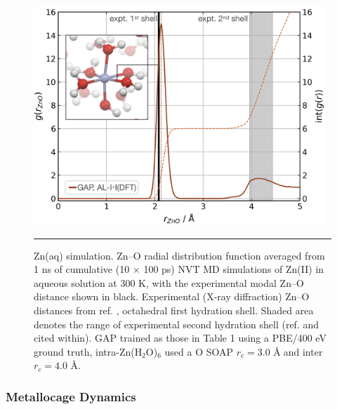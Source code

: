 \documentclass[../../main.tex]{subfiles}
\begin{document}
\begin{figure}[h!]
	\vspace{0.4cm}
	\centering
	\includegraphics[width=11cm]{6/gap/figs_ms/fig3}
	\vspace{0.2cm}
	\hrule
	\caption{Zn(aq) simulation. Zn–O radial distribution function averaged from 1 ns of cumulative (10 × 100 ps) NVT MD simulations of Zn(II) in aqueous solution at 300 K, with the experimental modal Zn–O distance shown in black. Experimental (X-ray diffraction) Zn–O distances from ref. \cite{Ohtaki1993}, octahedral first hydration shell. Shaded area denotes the range of experimental second hydration shell (ref. \cite{Ohtaki1993} and cited within). GAP trained as those in Table 1 using a PBE/400 eV ground truth, intra-Zn(H${}_2$O)${}_6$ used a O SOAP $r_c = 3.0$ \AA$\;$and inter $r_c = 4.0$ \AA.}
	\label{fig::ml_3}
\end{figure}


\subsubsection{Metallocage Dynamics}
\end{document}
